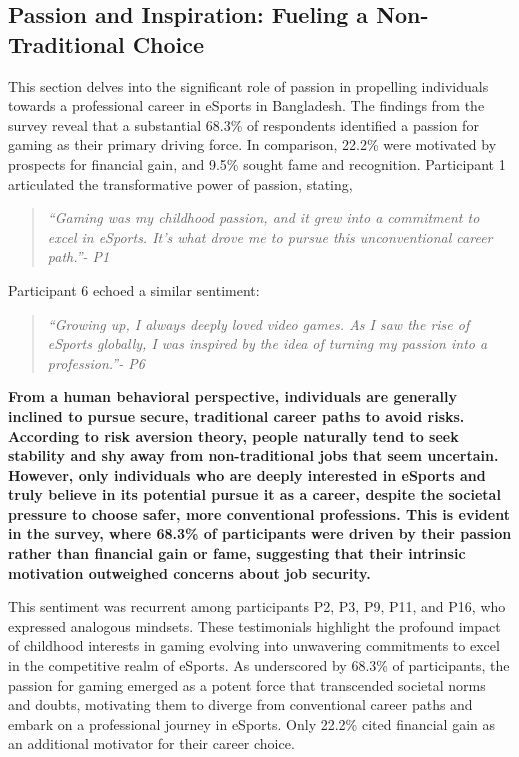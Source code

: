 \documentclass[manuscript,screen,review,anonymous]{acmart}
\begin{document}
\subsection{Passion and Inspiration: Fueling a Non-Traditional Choice}

This section delves into the significant role of passion in propelling individuals towards a professional career in eSports in Bangladesh. The findings from the survey reveal that a substantial 68.3\% of respondents identified a passion for gaming as their primary driving force. In comparison, 22.2\% were motivated by prospects for financial gain, and 9.5\% sought fame and recognition. Participant 1 articulated the transformative power of passion, stating,

\begin{quote}
    {\emph{``Gaming was my childhood passion, and it grew into a commitment to excel in eSports. It's what drove me to pursue this unconventional career path.''- P1}}
\end{quote}

Participant 6 echoed a similar sentiment:

\begin{quote}
    {\emph{``Growing up, I always deeply loved video games. As I saw the rise of eSports globally, I was inspired by the idea of turning my passion into a profession.''- P6}}
\end{quote}

\textbf{From a human behavioral perspective, individuals are generally inclined to pursue secure, traditional career paths to avoid risks. According to risk aversion theory, people naturally tend to seek stability and shy away from non-traditional jobs that seem uncertain. However, only individuals who are deeply interested in eSports and truly believe in its potential pursue it as a career, despite the societal pressure to choose safer, more conventional professions. This is evident in the survey, where 68.3\% of participants were driven by their passion rather than financial gain or fame, suggesting that their intrinsic motivation outweighed concerns about job security.}

This sentiment was recurrent among participants P2, P3, P9, P11, and P16, who expressed analogous mindsets. These testimonials highlight the profound impact of childhood interests in gaming evolving into unwavering commitments to excel in the competitive realm of eSports. As underscored by 68.3\% of participants, the passion for gaming emerged as a potent force that transcended societal norms and doubts, motivating them to diverge from conventional career paths and embark on a professional journey in eSports. Only 22.2\% cited financial gain as an additional motivator for their career choice.
\end{document}
